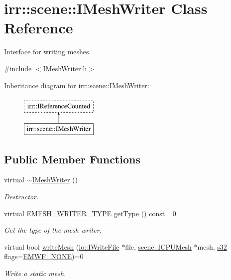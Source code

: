 \hypertarget{classirr_1_1scene_1_1IMeshWriter}{}\section{irr\+:\+:scene\+:\+:I\+Mesh\+Writer Class Reference}
\label{classirr_1_1scene_1_1IMeshWriter}


Interface for writing meshes.  




{\ttfamily \#include $<$I\+Mesh\+Writer.\+h$>$}

Inheritance diagram for irr\+:\+:scene\+:\+:I\+Mesh\+Writer\+:\begin{figure}[H]
\begin{center}
\leavevmode
\includegraphics[height=2.000000cm]{classirr_1_1scene_1_1IMeshWriter}
\end{center}
\end{figure}
\subsection*{Public Member Functions}
\begin{DoxyCompactItemize}
\item 
virtual \hyperlink{classirr_1_1scene_1_1IMeshWriter_a9f92ba59b4ea9a21ccc6bcddc0d3ada9}{$\sim$\+I\+Mesh\+Writer} ()\hypertarget{classirr_1_1scene_1_1IMeshWriter_a9f92ba59b4ea9a21ccc6bcddc0d3ada9}{}\label{classirr_1_1scene_1_1IMeshWriter_a9f92ba59b4ea9a21ccc6bcddc0d3ada9}

\begin{DoxyCompactList}\small\item\em Destructor. \end{DoxyCompactList}\item 
virtual \hyperlink{namespaceirr_1_1scene_a431fa15741518ba15f6d5f2608b6cb4e}{E\+M\+E\+S\+H\+\_\+\+W\+R\+I\+T\+E\+R\+\_\+\+T\+Y\+PE} \hyperlink{classirr_1_1scene_1_1IMeshWriter_a21453b44e10b79fb084a3914ac737aec}{get\+Type} () const  =0
\begin{DoxyCompactList}\small\item\em Get the type of the mesh writer. \end{DoxyCompactList}\item 
virtual bool \hyperlink{classirr_1_1scene_1_1IMeshWriter_a200fc475979168b3baa6804f02ffd1a6}{write\+Mesh} (\hyperlink{classirr_1_1io_1_1IWriteFile}{io\+::\+I\+Write\+File} $\ast$file, \hyperlink{classirr_1_1scene_1_1IMesh}{scene\+::\+I\+C\+P\+U\+Mesh} $\ast$mesh, \hyperlink{namespaceirr_ac66849b7a6ed16e30ebede579f9b47c6}{s32} flags=\hyperlink{namespaceirr_1_1scene_a9faae6cd9e415a0553cb4cdc190bbc1daf2dfebddfd0a2cd2b558e23cb6a87464}{E\+M\+W\+F\+\_\+\+N\+O\+NE})=0
\begin{DoxyCompactList}\small\item\em Write a static mesh. \end{DoxyCompactList}\end{DoxyCompactItemize}
